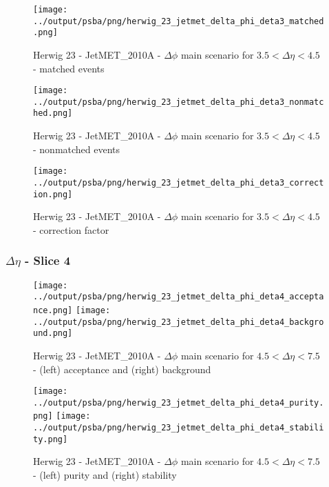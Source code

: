 \documentclass[11pt]{book}
\begin{document}
\begin{figure}[ht]
\centering
\texttt{[image: ../output/psba/png/herwig\_23\_jetmet\_delta\_phi\_deta3\_matched.png]}
\caption{Herwig 23 - JetMET\_2010A - $\Delta\phi$ main scenario for $3.5 < \Delta\eta < 4.5$ - matched events}
\label{fig:hw_23_jetmet_delta_phi_deta3_matched}
\end{figure}

\begin{figure}[ht]
\centering
\texttt{[image: ../output/psba/png/herwig\_23\_jetmet\_delta\_phi\_deta3\_nonmatched.png]}
\caption{Herwig 23 - JetMET\_2010A - $\Delta\phi$ main scenario for $3.5 < \Delta\eta < 4.5$ - nonmatched events}
\label{fig:hw_23_jetmet_delta_phi_deta3_nonmatched}
\end{figure}

\begin{figure}[ht]
\centering
\texttt{[image: ../output/psba/png/herwig\_23\_jetmet\_delta\_phi\_deta3\_correction.png]}
\caption{Herwig 23 - JetMET\_2010A - $\Delta\phi$ main scenario for $3.5 < \Delta\eta < 4.5$ - correction factor}
\label{fig:hw_23_jetmet_delta_phi_deta3_correction}
\end{figure}


\clearpage
\subsubsection{$\Delta\eta$ - Slice 4}

\begin{figure}[ht]
\centering
\texttt{[image: ../output/psba/png/herwig\_23\_jetmet\_delta\_phi\_deta4\_acceptance.png]}
\texttt{[image: ../output/psba/png/herwig\_23\_jetmet\_delta\_phi\_deta4\_background.png]}
\caption{Herwig 23 - JetMET\_2010A - $\Delta\phi$ main scenario for $4.5 < \Delta\eta < 7.5$ - (left) acceptance and (right) background}
\label{fig:hw_23_jetmet_delta_phi_deta4_ab}
\end{figure}

\begin{figure}[ht]
\centering
\texttt{[image: ../output/psba/png/herwig\_23\_jetmet\_delta\_phi\_deta4\_purity.png]}
\texttt{[image: ../output/psba/png/herwig\_23\_jetmet\_delta\_phi\_deta4\_stability.png]}
\caption{Herwig 23 - JetMET\_2010A - $\Delta\phi$ main scenario for $4.5 < \Delta\eta < 7.5$ - (left) purity and (right) stability}
\label{fig:hw_23_jetmet_delta_phi_deta4_ps}
\end{figure}
\end{document}
